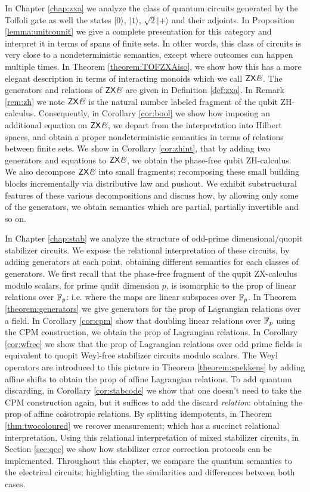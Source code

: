 In Chapter \ref{chap:zxa} we analyze the class of quantum circuits generated by the Toffoli gate as well the states $|0\rangle$, $|1\rangle$, $\sqrt{2}|+\rangle$ and their adjoints.  In Proposition \ref{lemma:unitcounit} we give a complete presentation for this category and interpret it in terms of spans of finite sets.  In other words, this class of circuits is very close to a nondeterministic semantics, except where outcomes can happen multiple times.  In Theorem \ref{theorem:TOFZXAiso}, we show how this has a more elegant  description in terms of interacting monoids which we call $\mathsf{ZX}\textit{\&}$.  The generators and relations of $\mathsf{ZX}\textit{\&}$ are given in Definition \ref{def:zxa}.    In Remark \ref{rem:zh} we note $\mathsf{ZX}\textit{\&}$  is the natural number labeled fragment of the qubit ZH-calculus.  Consequently, in Corollary \ref{cor:bool} we show how  imposing an additional equation on $\mathsf{ZX}\textit{\&}$, we depart from the interpretation into Hilbert spaces, and obtain a proper  nondeterministic semantics in terms of relations between finite sets.  We show in Corollary \ref{cor:zhint}, that by adding two generators and equations to $\mathsf{ZX}\textit{\&}$,  we obtain the phase-free qubit ZH-calculus.
We also decompose $\mathsf{ZX}\textit{\&}$  into small fragments; recomposing these small building blocks incrementally via distributive law and pushout.
We exhibit substructural features of these various decompositions and discuss how, by allowing only some of the generators, we obtain semantics which are partial, partially invertible and so on.


In Chapter \ref{chap:stab}  we analyze the structure of odd-prime dimensional/quopit stabilizer circuits.
We expose the relational interpretation of these circuits, by adding generators at each point, obtaining different semantics for each classes of generators.  We first recall that the phase-free fragment of the qupit ZX-calculus modulo scalars, for prime qudit dimension $p$, is isomorphic to the prop of linear relations over $\mathbb{F}_p$: i.e. where the maps are linear subspaces over $\mathbb{F}_p$.
In Theorem \ref{theorem:generators} we give generators for the prop of Lagrangian relations over a field.
In Corollary \ref{cor:cpm} show that doubling  linear relations over $\mathbb{F}_p$ using the CPM construction, we obtain the prop of  Lagrangian relations. In Corollary \ref{cor:wfree} we  show that the prop of  Lagrangian relations over odd prime fields is equivalent to quopit Weyl-free stabilizer circuits modulo scalars. The Weyl operators are introduced to this picture in Theorem \ref{theorem:spekkens} by adding affine shifts to obtain the prop of affine Lagrangian relations. To add quantum discarding, in Corollary \ref{cor:stabcode} we show that one doesn't need to take the CPM construction again, but it suffices to add the discard {\em relation}:   obtaining the prop of affine coisotropic relations.  By splitting idempotents, in Theorem \ref{thm:twocoloured} we recover measurement; which has a succinct relational interpretation.  Using this relational interpretation of mixed stabilizer circuits, in Section \ref{sec:qec} we show how stabilizer error correction protocols can be implemented.  Throughout this chapter, we compare the quantum semantics to the electrical circuits; highlighting the similarities and differences between both cases.


